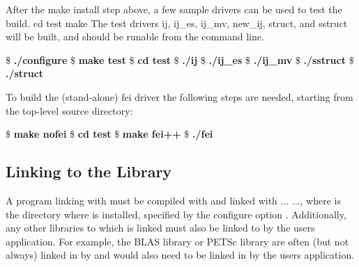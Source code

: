 After the make install step above, a few sample
drivers can be used to test the build. cd test make The test drivers ij,
ij\_es, ij\_mv, new\_ij, struct, and sstruct will be built, and should 
be runable from the command line. 
\begin{ttfamily}
\begin{mdseries}
\linebreak
\$ \textbf{./configure}\linebreak
\$ \textbf{make test}\linebreak
\$ \textbf{cd test}\linebreak
\$ \textbf{./ij}\linebreak
\$ \textbf{./ij\_es}\linebreak
\$ \textbf{./ij\_mv}\linebreak
\$ \textbf{./sstruct}\linebreak
\$ \textbf{./struct}\linebreak
\linebreak
\end{mdseries}
\end{ttfamily}
To build the (stand-alone) fei driver the following 
steps are needed, starting from the top-level source directory: 
\begin{ttfamily}
\begin{mdseries}
\linebreak
\$ \textbf{make nofei}\linebreak
\$ \textbf{cd test}\linebreak
\$ \textbf{make fei++}\linebreak
\$ \textbf{./fei}\linebreak
\linebreak 
\end{mdseries}
\end{ttfamily}

\subsection{Linking to the Library}

A program linking with \hypre{} must be compiled with
 and linked with
... 
..., where  is the
directory where \hypre{} is installed, specified by the configure
option .  Additionally, any other
libraries to which \hypre{} is linked must also be linked to by the
users application.  For example, the BLAS library or PETSc library are
often (but not always) linked in by \hypre{} and would also need to be
linked in by the users application.

